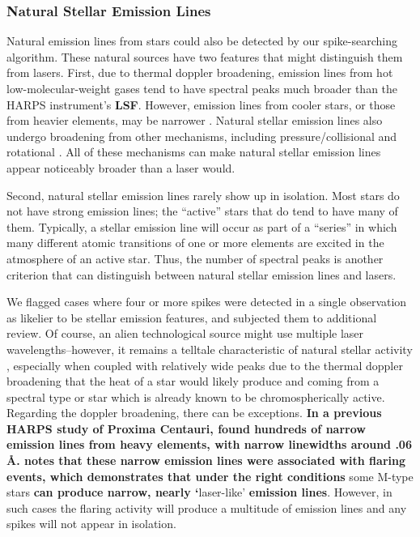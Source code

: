 \documentclass[linenumbers]{aastex701}
\providecommand{\DIFadd}[1]{{\bf #1}} %
\providecommand{\DIFaddbegin}{} %
\providecommand{\DIFaddend}{} %
\begin{document}
\subsubsection{Natural Stellar Emission Lines}
\label{s:stellaremission}
Natural emission lines from stars could also be detected by our spike-searching algorithm.  These natural sources have two features that might distinguish them from lasers. First, due to thermal doppler broadening, emission lines from hot low-molecular-weight gases tend to have spectral peaks much broader than the HARPS instrument's  \DIFaddbegin \DIFadd{LSF}\DIFaddend . However, emission lines from cooler stars, or those from heavier elements, may be narrower \citep{Livadiotis_2018}. Natural stellar emission lines also undergo broadening from other mechanisms, including pressure/collisional \citep{Peach2006} and rotational \citep{Rotational_Broadening}. All of these mechanisms can make natural stellar emission lines appear noticeably broader than a laser would. 

Second, natural stellar emission lines rarely show up in isolation. Most stars do not have strong emission lines; the  \DIFaddbegin \enquote{active} \DIFaddend stars that do tend to have many of them. Typically, a stellar emission line will occur as part of a “series” in which many different atomic transitions of one or more elements are excited in the atmosphere of an active star.  Thus, the number of spectral peaks is another criterion that can distinguish between natural stellar emission lines and lasers. 

We flagged cases  where four or more spikes were detected in a single observation as likelier to be stellar emission features, and subjected them to additional review. Of course, an alien technological source might use multiple laser wavelengths--however, it remains a telltale characteristic of natural stellar activity \citep{Livadiotis_2018}, especially when coupled with relatively wide peaks due to the thermal doppler broadening that the heat of a star would likely produce and coming from a spectral type or star which is already known to be chromospherically active. Regarding the doppler broadening, there can be exceptions.  \DIFaddbegin \DIFadd{In a previous HARPS study of Proxima Centauri, \citep{ProximaCentauri} found hundreds of narrow emission lines from heavy elements, with narrow linewidths around .06 \AA. \cite{ProximaCentauri} notes that these narrow emission lines were associated with flaring events, which demonstrates that under the right conditions }\DIFaddend some M-type stars  \DIFaddbegin \DIFadd{can produce narrow, nearly `}\DIFaddend laser-like'  \DIFaddbegin \DIFadd{emission lines}\DIFaddend . However, in such cases the flaring activity will produce a multitude of emission lines and any spikes will not appear in isolation.
\end{document}
